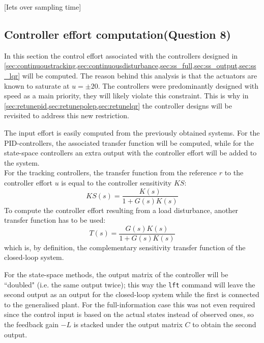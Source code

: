 [Iets over sampling time]
\subsection{Controller effort computation\textnormal{\phantom{xxx}(Question 8)}}
In this section the control effort associated with the controllers designed in \cref{sec:continuoustracking,sec:continuousdisturbance,sec:ss_full,sec:ss_output,sec:ss_lqr} will be computed. The reason behind this analysis is that the actuators are known to saturate at $u = \pm20$. The controllers were predominantly designed with speed as a main priority, they will likely violate this constraint. This is why in \cref{sec:retunepid,sec:retunepolep,sec:retunelqr} the controller designs will be revisited to address this new restriction.

The input effort is easily computed from the previously obtained systems. For the PID-controllers, the associated transfer function will be computed, while for the state-space controllers an extra output with the controller effort will be added to the system.\\
\indent For the tracking controllers, the transfer function from the reference $r$ to the controller effort $u$ is equal to the controller sensitivity $KS$:
$$ KS(s) = \frac{K(s)}{1 + G(s)K(s)} $$
To compute the controller effort resulting from a load disturbance, another transfer function has to be used:
$$ T(s) = \frac{G(s)K(s)}{1 + G(s)K(s)}$$
which is, by definition, the complementary sensitivity transfer function of the closed-loop system. 

For the state-space methods, the output matrix of the controller will be ``doubled" (i.e. the same output twice); this way the \texttt{lft} command will leave the second output as an output for the closed-loop system while the first is connected to the generalised plant. For the full-information case this was not even required since the control input is based on the actual states instead of observed ones, so the feedback gain $-L$ is stacked under the output matrix $C$ to obtain the second output.

